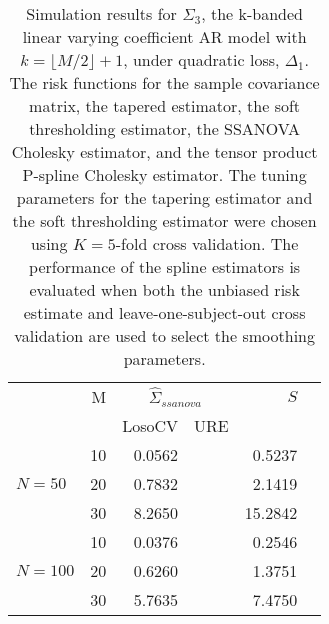 \documentclass[12pt]{article}
\theoremstyle{definition}
\begin{document}

\begin{table}[ht]
\centering
\caption{Simulation results for $\Sigma_3$, the k-banded linear varying coefficient AR model with $k = \lfloor M/2\rfloor + 1$, under quadratic loss, $\Delta_1$. The risk functions for the sample covariance matrix, the tapered estimator, the soft thresholding estimator, the SSANOVA Cholesky estimator, and the tensor product P-spline Cholesky estimator. The tuning parameters for the tapering estimator and the soft thresholding estimator were chosen using $K = 5$-fold cross validation. The performance of the spline estimators is evaluated when both the unbiased risk estimate and leave-one-subject-out cross validation are used to select the smoothing parameters.}

\begin{tabular}{lrrrrr}
& M & \multicolumn{2}{c}{$\hat{\Sigma}_{ssanova}$} & $S$ \\ 
& & \mbox{LosoCV} & \mbox{URE} &  \\   \hline  \hline
 	          &    10 & 0.0562 & & 0.5237 \\ 
 $N = 50$ 	 &     20 & 0.7832 & & 2.1419 \\ 
  		  &    30 & 8.2650 & & 15.2842 \\ \hdashline
		  &    10 & 0.0376 & &0.2546 \\ 
 $N = 100$  &    20 & 0.6260 & & 1.3751 \\ 
   &    30 & 5.7635 && 7.4750 \\ 
   \hline
\end{tabular}
\end{table}
\end{document}
